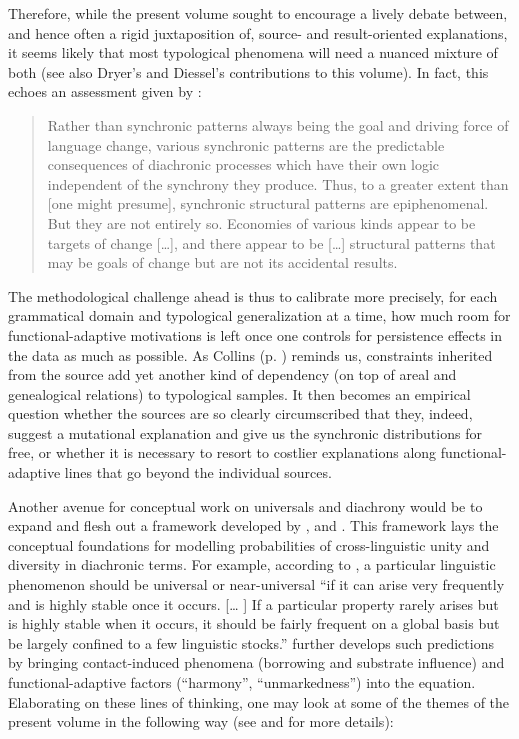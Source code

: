 \documentclass[output=paper]{langsci/langscibook}
\begin{document}
Therefore, while the present volume sought to encourage a lively debate between, and hence often a rigid juxtaposition of, source- and result-oriented explanations, it seems likely that most typological phenomena will need a nuanced mixture of both (see also Dryer’s and Diessel’s contributions to this volume). In fact, this echoes an assessment given by \citet[287--288]{Nichols2008_Diach}:

\begin{quote}
Rather than synchronic patterns always being the goal and driving force of language change, various synchronic patterns are the predictable consequences of diachronic processes which have their own logic independent of the synchrony they produce. Thus, to a greater extent than [one might presume], synchronic structural patterns are epiphenomenal. But they are not entirely so. Economies of various kinds appear to be targets of change […], and there appear to be […] structural patterns that may be goals of change but are not its accidental results.
\end{quote}

The methodological challenge ahead is thus to calibrate more precisely, for each grammatical domain and typological generalization at a time, how much room for functional-adaptive motivations is left once one controls for persistence effects in the data as much as possible. As Collins (p. \pageref{p:collins:dependency}) reminds us, constraints inherited from the source add yet another kind of dependency (on top of areal and genealogical relations) to typological samples. It then becomes an empirical question whether the sources are so clearly circumscribed that they, indeed, suggest a mutational explanation and give us the synchronic distributions for free, or whether it is necessary to resort to costlier explanations along functional-adaptive lines that go beyond the individual sources.

Another avenue for conceptual work on universals and diachrony would be to expand and flesh out a framework developed by \citet{Greenberg1978_Diachr}, \citet{Nichols1992,Nichols2003} and \citet{Bickel2013}. This framework lays the conceptual foundations for modelling probabilities of cross-linguistic unity and diversity in diachronic terms. For example, according to \citet[76]{Greenberg1978_Diachr}, a particular linguistic phenomenon should be universal or near-universal “if it can arise very frequently and is highly stable once it occurs. [… ] If a particular property rarely arises but is highly stable when it occurs, it should be fairly frequent on a global basis but be largely confined to a few linguistic stocks.” \citet[287--288]{Nichols2008_Diach} further develops such predictions by bringing contact-induced phenomena (borrowing and substrate influence) and functional-adaptive factors (“harmony”, “unmarkedness”) into the equation. Elaborating on these lines of thinking, one may look at some of the themes of the present volume in the following way (see \citealt{Grossman2016} and \citealt{GrossmanEtAl2018} for more details):
\end{document}
